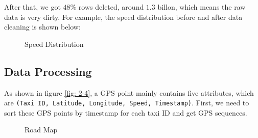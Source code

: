 \documentclass[fontset=none]{ctexart}
\theoremstyle{definition}
\theoremstyle{remark}
\begin{document}
After that, we got $48\%$ rows deleted, around $1.3$ billon, which means the raw data is very dirty.
For example, the speed distribution before and after data cleaning is shown below:
\begin{figure}[h]
  \centering
  \quad
  \caption{Speed Distribution}
\end{figure}

\subsection{Data Processing}
As shown in figure \ref{fig: 2-4}, a GPS point mainly contains five attributes, which are
\texttt{(Taxi ID, Latitude, Longitude, Speed, Timestamp)}. First, we need to sort these GPS
points by timestamp for each taxi ID and get GPS sequences.

\begin{figure}[htb]
  \centering
  \quad
  \caption{Road Map}
\end{figure}
\end{document}
